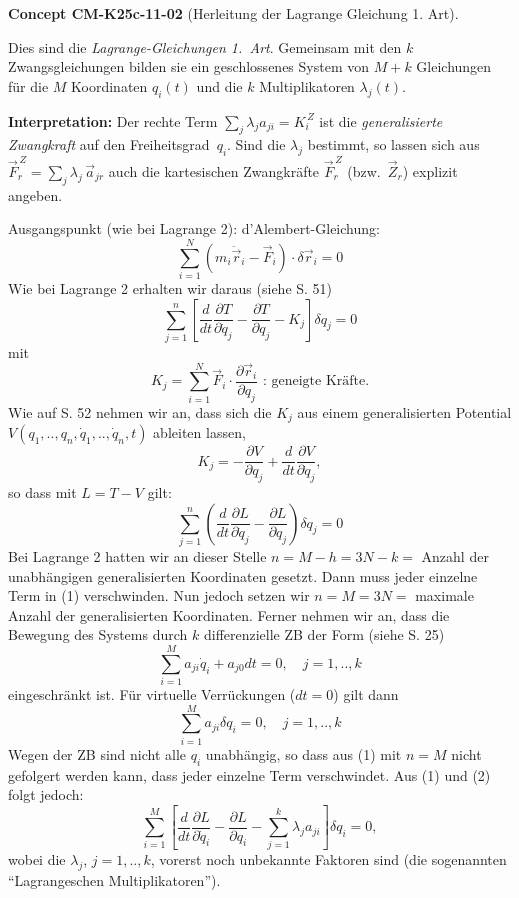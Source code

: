 \documentclass[10pt, letterpaper]{article}
\newcommand{\CustomHeading}[3]{%
  \par\medskip\noindent%
  \textbf{#1 #2} \textnormal{(#3)}.\enskip%
}
\newenvironment{CONC}[2]{\begin{unitbox}\CustomHeading{Concept}{#1}{#2}}{\end{unitbox}}
\begin{document}
\begin{CONC}{CM-K25c-11-02}{Herleitung der Lagrange Gleichung 1. Art}
Dies sind die \emph{Lagrange-Gleichungen 1.\ Art}.  
Gemeinsam mit den $k$ Zwangsgleichungen bilden sie ein geschlossenes
System von $M+k$ Gleichungen für die $M$ Koordinaten $q_i(t)$ und die
$k$ Multiplikatoren $\lambda_j(t)$.

\bigskip
\noindent
\textbf{Interpretation:}  
Der rechte Term
$\displaystyle
  \sum_{j}\lambda_j a_{ji}
  =K_i^{\,Z}
$
ist die \emph{generalisierte Zwangkraft} auf den Freiheitsgrad~$q_i$.
Sind die $\lambda_j$ bestimmt, so lassen sich aus
\(
  \vec F_r^{\,Z}
  =\sum_{j}\lambda_j\,\vec a_{jr}
\)
auch die kartesischen Zwangkräfte $\vec F_r^{\,Z}$ (bzw.\ $\vec Z_r$)
explizit angeben.
\end{CONC}




Ausgangspunkt (wie bei Lagrange 2): d'Alembert-Gleichung:
\[\sum_{i=1}^N (m_i\ddot{\vec{r}}_i-\vec{F}_i)\cdot\delta\vec{r}_i = 0\]
Wie bei Lagrange 2 erhalten wir daraus (siehe S. 51)
\[\sum_{j=1}^n \left[\frac{d}{dt}\frac{\partial T}{\partial \dot{q}_j} - \frac{\partial T}{\partial q_j} - K_j\right]\delta q_j = 0\]
mit \[K_j = \sum_{i=1}^N \vec{F}_i\cdot\frac{\partial \vec{r}_i}{\partial q_j} \text{ : geneigte Kräfte.}\]
Wie auf S. 52 nehmen wir an, dass sich die $K_j$ aus einem generalisierten Potential $V(q_1,..,q_n,\dot{q}_1,..,\dot{q}_n,t)$ ableiten lassen,
\[K_j = -\frac{\partial V}{\partial q_j} + \frac{d}{dt}\frac{\partial V}{\partial \dot{q}_j},\]
so dass mit $L = T-V$ gilt:
\[\sum_{j=1}^n \left(\frac{d}{dt}\frac{\partial L}{\partial \dot{q}_j} - \frac{\partial L}{\partial q_j}\right)\delta q_j = 0 \tag{1}\]
Bei Lagrange 2 hatten wir an dieser Stelle $n=M-h=3N-k =$ Anzahl der unabhängigen generalisierten Koordinaten gesetzt. Dann muss jeder einzelne Term in (1) verschwinden. Nun jedoch setzen wir $n=M=3N =$ maximale Anzahl der generalisierten Koordinaten. Ferner nehmen wir an, dass die Bewegung des Systems durch $k$ differenzielle ZB der Form (siehe S. 25)
\[\sum_{i=1}^M a_{ji} \dot{q}_i + a_{j0} dt = 0, \quad j=1,..,k\]
eingeschränkt ist. Für virtuelle Verrückungen ($dt=0$) gilt dann
\[\sum_{i=1}^M a_{ji} \delta q_i = 0, \quad j=1,..,k \tag{2}\]
Wegen der ZB sind nicht alle $q_i$ unabhängig, so dass aus (1) mit $n=M$ nicht gefolgert werden kann, dass jeder einzelne Term verschwindet. Aus (1) und (2) folgt jedoch:
\[\sum_{i=1}^M \left[\frac{d}{dt}\frac{\partial L}{\partial \dot{q}_i} - \frac{\partial L}{\partial q_i} - \sum_{j=1}^k \lambda_j a_{ji}\right]\delta q_i = 0,\]
wobei die $\lambda_j$, $j=1,..,k$, vorerst noch unbekannte Faktoren sind (die sogenannten ``Lagrangeschen Multiplikatoren'').
\end{document}
